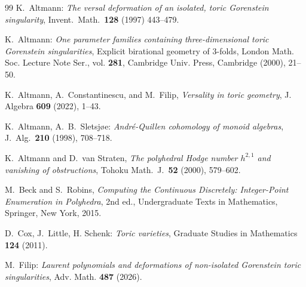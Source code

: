 \documentclass[11pt]{amsart}
\numberwithin{equation}{section}
\theoremstyle{plain}
\theoremstyle{definition}
\newcommand{\0}{$0$-mutable}
\renewcommand{\1}{$1$-rigid}
\renewcommand{\0}{$0$-mutable}
\begin{document}
\begin{thebibliography}{99}
{K.\ Altmann: \emph{The versal deformation of an isolated, toric Gorenstein singularity}, Invent.\ Math.\ \textbf{128} (1997) 443--479.}

{K.\ Altmann:  \emph{One parameter families containing three-dimensional toric Gorenstein singularities}, Explicit birational geometry of 3-folds, London Math. Soc. Lecture Note Ser., vol. \textbf{281}, Cambridge Univ. Press, Cambridge (2000), 21--50.}

K.~Altmann, A.~Constantinescu, and M.~Filip,
\emph{Versality in toric geometry},
J. Algebra \textbf{609} (2022), 1--43.

{K.\ Altmann, A.\ B.\ Sletsj\o e: \emph{Andr\'e-Quillen cohomology of monoid algebras}, J.\ Alg.\ \textbf{210} (1998), 708--718.}


K.\ Altmann and D.\ van Straten,
\emph{The polyhedral Hodge number \(h^{2,1}\) and vanishing of obstructions},
Tohoku Math.\ J.\ \textbf{52} (2000), 579--602.


M.~Beck and S.~Robins,
\emph{Computing the Continuous Discretely:
Integer-Point Enumeration in Polyhedra},
2nd ed., Undergraduate Texts in Mathematics,
Springer, New York, 2015.












{D.\ Cox, J.\ Little, H. Schenk: \emph{Toric varieties}, Graduate Studies in Mathematics \textbf{124} (2011).}


M.\ Filip: 
\emph{Laurent polynomials and deformations of non-isolated Gorenstein toric singularities}, Adv. Math. \textbf{487} (2026).



\end{thebibliography}
\end{document}
